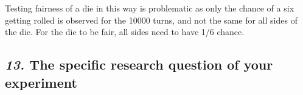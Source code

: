 \documentclass[12pt, english]{article}
\begin{document}
\vspace{10pt}

Testing fairness of a die in this way is problematic as only the chance of a six getting rolled is observed for the 10000 turns, and not the same for all sides of the die. For the die to be fair, all sides need to have 1/6 chance. 
\vspace{10pt}

\subsection*{\emph{13.} The specific research question of your experiment}
\vspace{10pt}
\end{document}
